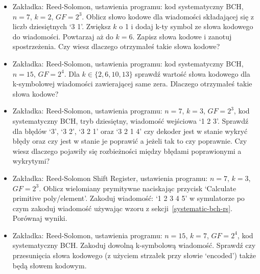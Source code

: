 \begin{itemize}
    \item Zakładka: Reed-Solomon, ustawienia programu: kod systematyczny BCH, $n=7$, $k=2$, $GF=2^3$.
    Oblicz słowo kodowe dla wiadomości składającej się z liczb dziesiętnych `3 1'.
    Zwiększ $k$ o 1 i dodaj k-ty symbol ze słowa kodowego do wiadomości. Powtarzaj aż do $k=6$.
    Zapisz słowa kodowe i zanotuj spostrzeżenia.
    Czy wiesz dlaczego otrzymałeś takie słowa kodowe?
    \item Zakładka: Reed-Solomon, ustawienia programu: kod systematyczny BCH, $n=15$, $GF=2^4$.
    Dla $k \in \{ 2, 6, 10, 13 \}$ sprawdź wartość słowa kodowego dla k-symbolowej wiadomości zawierającej same zera. Dlaczego otrzymałeś takie słowa kodowe?
    \item Zakładka: Reed-Solomon, ustawienia programu: $n = 7$, $k = 3$, $GF = 2^3$,
    kod systematyczny BCH, tryb dziesiętny, wiadomość wejściowa `1 2 3'.
    Sprawdź dla błędów `3', `3 2', `3 2 1' oraz `3 2 1 4' czy dekoder jest w stanie
    wykryć błędy oraz czy jest w stanie je poprawić a jeżeli tak to czy poprawnie.
    Czy wiesz dlaczego pojawiły się rozbieżności między błędami poprawionymi a wykrytymi?
    \item Zakładka: Reed-Solomon Shift Register, ustawienia programu:
    $n = 7$, $k = 3$, $GF = 2^3$. Oblicz wielomiany prymitywne naciskając przycisk
    `Calculate primitive poly/element'.
    Zakoduj wiadomość: `1 2 3 4 5' w symulatorze po czym zakoduj wiadomość
    używając wzoru z sekcji~\ref{systematic-bch-rs}. Porównaj wyniki.
    \item Zakładka: Reed-Solomon, ustawienia programu: $n = 15$, $k=7$, $GF = 2^4$,
    kod systematyczny BCH.
    Zakoduj dowolną k-symbolową wiadomość. Sprawdź czy przesunięcia słowa kodowego
    (z użyciem strzałek przy słowie `encoded') także będą słowem kodowym.
\end{itemize}
